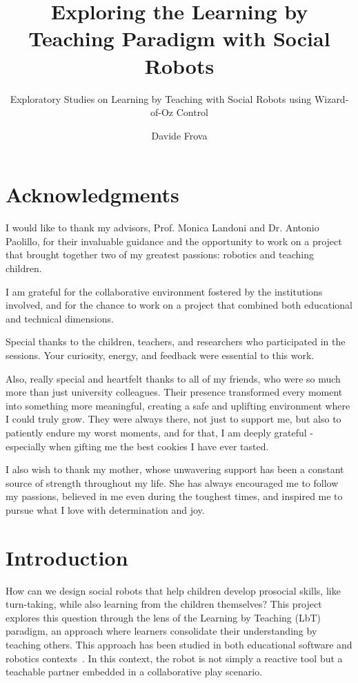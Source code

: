 \documentclass[a4paper]{usiinfbachelorproject}
\author{Davide Frova}
\title{\textbf{Exploring the Learning by Teaching Paradigm with Social Robots}}
\subtitle{Exploratory Studies on Learning by Teaching with Social Robots using Wizard-of-Oz Control}
\begin{document}
\maketitle

\section*{Acknowledgments}

I would like to thank my advisors, Prof. Monica Landoni and Dr. Antonio Paolillo, for their invaluable guidance and the opportunity to work on a project that brought together two of my greatest passions: robotics and teaching children.

I am grateful for the collaborative environment fostered by the institutions involved, and for the chance to work on a project that combined both educational and technical dimensions.

Special thanks to the children, teachers, and researchers who participated in the sessions. Your curiosity, energy, and feedback were essential to this work.


Also, really special and heartfelt thanks to all of my friends, who were so much more than just university colleagues.
Their presence transformed every moment into something more meaningful, creating a safe and uplifting environment where I could truly grow.
They were always there, not just to support me, but also to patiently endure my worst moments, and for that, I am deeply grateful - especially when gifting me the best cookies I have ever tasted.

I also wish to thank my mother, whose unwavering support has been a constant source of strength throughout my life.
She has always encouraged me to follow my passions, believed in me even during the toughest times, and inspired me to pursue what I love with determination and joy.

\newpage
\tableofcontents\newpage

\section{\textbf{Introduction}}

How can we design social robots that help children develop prosocial skills, like turn-taking, while also learning from the children themselves?
This project explores this question through the lens of the Learning by Teaching (LbT) paradigm, an approach where learners consolidate their understanding by teaching others.
This approach has been studied in both educational software and robotics contexts~\cite{biswas2005learning, 10.5898/JHRI.1.1.Tanaka}.
In this context, the robot is not simply a reactive tool but a teachable partner embedded in a collaborative play scenario.
\end{document}
